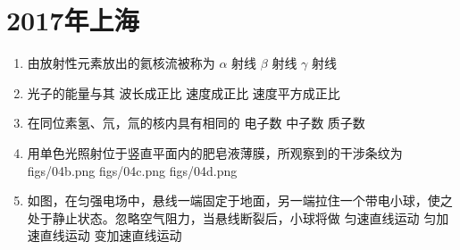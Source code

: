 \documentclass[\gkver]{gaokaozhenti}
\begin{document}
\chapter{2017年上海}

\begin{enumerate}
\item
由放射性元素放出的氦核流被称为
{$\alpha$ 射线}
{$\beta$ 射线}
{$\gamma$ 射线}

\item
光子的能量与其
{波长成正比}
{速度成正比}
{速度平方成正比}

\item
在同位素氢、氘，氚的核内具有相同的
{电子数}
{中子数}
{质子数}

\item
用单色光照射位于竖直平面内的肥皂液薄膜，所观察到的干涉条纹为
{figs/04b.png}
{figs/04c.png}
{figs/04d.png}

\item
如图，在匀强电场中，悬线一端固定于地面，另一端拉住一个带电小球，使之处于静止状态。忽略空气阻力，当悬线断裂后，小球将做
\onepicture[align=right, w=2.23cm]{}
{匀速直线运动}
{匀加速直线运动}
{变加速直线运动}


\end{enumerate}
\end{document}

